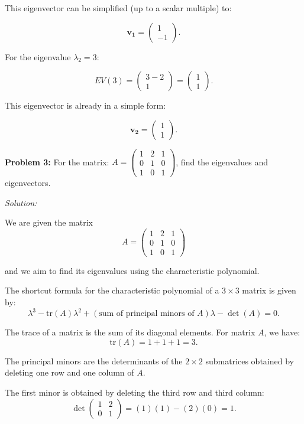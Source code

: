 \documentclass[
  letterpaper,
  DIV=11,
  numbers=noendperiod]{scrreprt}
\theoremstyle{plain}
\theoremstyle{definition}
\theoremstyle{remark}
\begin{document}
This eigenvector can be simplified (up to a scalar multiple) to:

\[
\mathbf{v_1} = \begin{pmatrix} 1 \\ -1 \end{pmatrix}.
\]

For the eigenvalue \(\lambda_2 = 3\):

\[
EV(3) = \begin{pmatrix} 3 - 2 \\ 1 \end{pmatrix} = \begin{pmatrix} 1 \\ 1 \end{pmatrix}.
\]

This eigenvector is already in a simple form:

\[
\mathbf{v_2} = \begin{pmatrix} 1 \\ 1 \end{pmatrix}.
\]

\textbf{Problem 3:} For the matrix:
\(A = \begin{pmatrix} 1 & 2 & 1 \\ 0 & 1 & 0 \\ 1 & 0 & 1 \end{pmatrix}\),
find the eigenvalues and eigenvectors.

\emph{Solution:}

We are given the matrix \[
A = \begin{pmatrix} 1 & 2 & 1 \\ 0 & 1 & 0 \\ 1 & 0 & 1 \end{pmatrix}
\]

and we aim to find its eigenvalues using the characteristic polynomial.

The shortcut formula for the characteristic polynomial of a
\(3 \times 3\) matrix is given by: \[
\lambda^3 - \text{tr}(A)\lambda^2 + (\text{sum of principal minors of } A)\lambda - \det(A) = 0.
\]

The trace of a matrix is the sum of its diagonal elements. For matrix
\(A\), we have: \[
\text{tr}(A) = 1 + 1 + 1 = 3.
\]

The principal minors are the determinants of the \(2 \times 2\)
submatrices obtained by deleting one row and one column of \(A\).

The first minor is obtained by deleting the third row and third column:
\[
\det\begin{pmatrix} 1 & 2 \\ 0 & 1 \end{pmatrix} = (1)(1) - (2)(0) = 1.
\]
\end{document}
